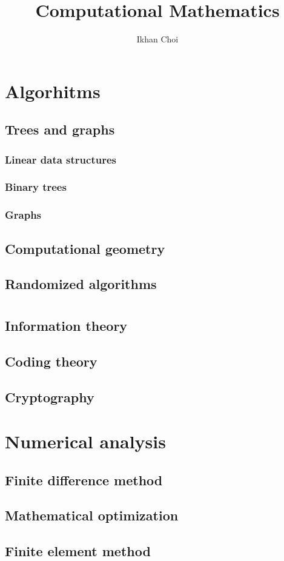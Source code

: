 \documentclass{../note}
\begin{document}
\title{Computational Mathematics}
\author{Ikhan Choi}
\maketitle
\tableofcontents

\part{Algorhitms}
\chapter{Trees and graphs}
\section{Linear data structures}
\section{Binary trees}
\section{Graphs}

\chapter{Computational geometry}
\chapter{Randomized algorithms}


\part{}
\chapter{Information theory}
\chapter{Coding theory}
\chapter{Cryptography}

\part{}


\part{Numerical analysis}
\chapter{Finite difference method}
\chapter{Mathematical optimization}
\chapter{Finite element method}
\end{document}
